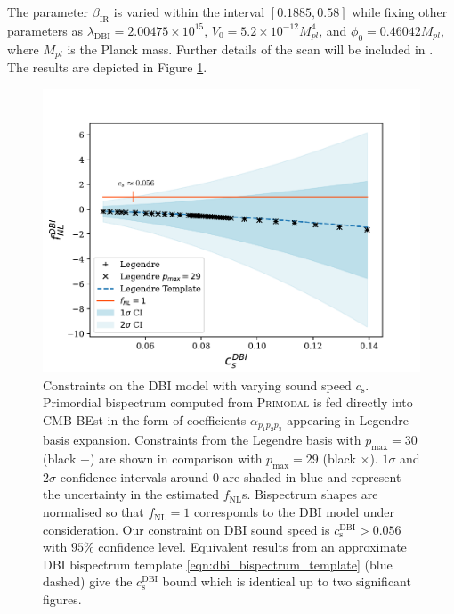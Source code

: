 The parameter $\beta_\text{IR}$ is varied within the interval $[0.1885,0.58]$ while fixing other parameters as $\lambda_\text{DBI} = 2.00475 \times 10^15$, $V_0 = 5.2 \times 10^{-12} M^4_{pl}$, and $\phi_0 = 0.46042 M_{pl}$, where $M_{pl}$ is the Planck mass. Further details of the scan will be included in \cite{Sohn2021inprep}. The results are depicted in Figure \ref{fig:dbi_sound_speed_scan}.

\begin{figure}[htbp!] 
	\centering    
	\includegraphics[width=\textwidth]{dbi_sound_speed_scan_annotated_new.pdf}
	\caption{Constraints on the DBI model with varying sound speed $c_\text{s}$. Primordial bispectrum computed from \textsc{Primodal} is fed directly into CMB-BEst in the form of coefficients $\alpha_{p_1 p_2 p_3}$ appearing in Legendre basis expansion. Constraints from the Legendre basis with $p_\text{max}=30$ (black $+$) are shown in comparison with $p_\text{max}=29$ (black $\times$). $1\sigma$ and $2\sigma$ confidence intervals around $0$ are shaded in blue and represent the uncertainty in the estimated $f_\text{NL}$s. Bispectrum shapes are normalised so that $f_\text{NL}=1$ corresponds to the DBI model under consideration. Our constraint on DBI sound speed is $c^\text{DBI}_\text{s} > 0.056$ with $95\%$ confidence level. Equivalent results from an approximate DBI bispectrum template \eqref{eqn:dbi_bispectrum_template} (blue dashed) give the $c^\text{DBI}_\text{s}$ bound which is identical up to two significant figures.}
	\label{fig:dbi_sound_speed_scan}
\end{figure}

